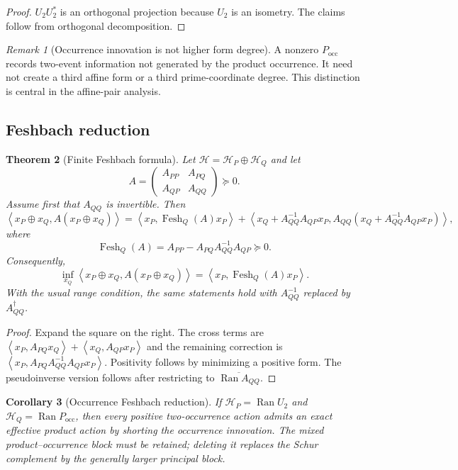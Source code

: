 \documentclass[11pt]{article}
\newtheorem{theorem}{Theorem}[section]
\newtheorem{corollary}[theorem]{Corollary}
\theoremstyle{definition}
\theoremstyle{remark}
\newtheorem{remark}[theorem]{Remark}
\newcommand{\Ran}{\operatorname{Ran}}
\newcommand{\ip}[2]{\left\langle#1,#2\right\rangle}
\newcommand{\occ}{\mathrm{occ}}
\newcommand{\Fesh}{\operatorname{Fesh}}
\begin{document}
\begin{proof}
$U_2U_2^*$ is an orthogonal projection because $U_2$ is an isometry.  The
claims follow from orthogonal decomposition.
\end{proof}

\begin{remark}[Occurrence innovation is not higher form degree]
A nonzero $P_{\occ}$ records two-event information not generated by the
product occurrence.  It need not create a third affine form or a third
prime-coordinate degree.  This distinction is central in the affine-pair
analysis.
\end{remark}

\subsection{Feshbach reduction}

\begin{theorem}[Finite Feshbach formula]
\label{thm:gran-feshbach}
Let $\mathcal H=\mathcal H_P\oplus\mathcal H_Q$ and let
\[
 A=\begin{pmatrix}A_{PP}&A_{PQ}\\A_{QP}&A_{QQ}\end{pmatrix}\succeq0.
\]
Assume first that $A_{QQ}$ is invertible.  Then
\[
 \ip{x_P\oplus x_Q}{A(x_P\oplus x_Q)}
 =\ip{x_P}{\Fesh_Q(A)x_P}
 +\ip{x_Q+A_{QQ}^{-1}A_{QP}x_P}
          {A_{QQ}(x_Q+A_{QQ}^{-1}A_{QP}x_P)},
\]
where
\[
 \Fesh_Q(A)=A_{PP}-A_{PQ}A_{QQ}^{-1}A_{QP}\succeq0.
\]
Consequently,
\[
 \inf_{x_Q}\ip{x_P\oplus x_Q}{A(x_P\oplus x_Q)}
 =\ip{x_P}{\Fesh_Q(A)x_P}.
\]
With the usual range condition, the same statements hold with
$A_{QQ}^{-1}$ replaced by $A_{QQ}^\dagger$.
\end{theorem}

\begin{proof}
Expand the square on the right.  The cross terms are
$\ip{x_P}{A_{PQ}x_Q}+\ip{x_Q}{A_{QP}x_P}$ and the remaining correction is
$\ip{x_P}{A_{PQ}A_{QQ}^{-1}A_{QP}x_P}$.  Positivity follows by minimizing a
positive form.  The pseudoinverse version follows after restricting to
$\overline{\Ran A_{QQ}}$.
\end{proof}

\begin{corollary}[Occurrence Feshbach reduction]
If $\mathcal H_P=\Ran U_2$ and $\mathcal H_Q=\Ran P_{\occ}$, then every
positive two-occurrence action admits an exact effective product action by
shorting the occurrence innovation.  The mixed product--occurrence block must
be retained; deleting it replaces the Schur complement by the generally
larger principal block.
\end{corollary}
\end{document}
